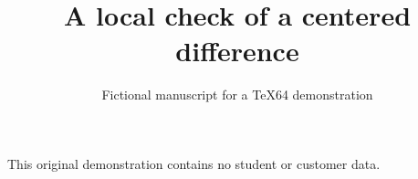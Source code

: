 \documentclass[11pt]{article}
\title{A local check of a centered difference}
\author{Fictional manuscript for a TeX64 demonstration}
\date{}
\begin{document}
\maketitle
This original demonstration contains no student or customer data.

\end{document}
